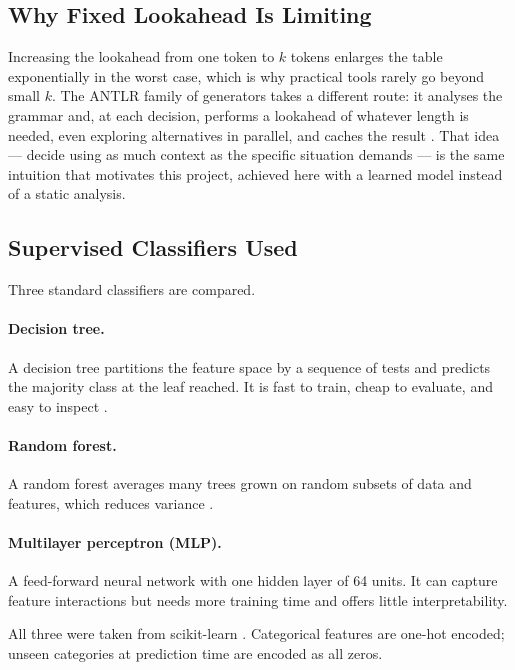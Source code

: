 \documentclass[12pt,a4paper]{article}
\begin{document}
\subsection{Why Fixed Lookahead Is Limiting}

Increasing the lookahead from one token to $k$ tokens enlarges the table
exponentially in the worst case, which is why practical tools rarely go beyond
small $k$. The ANTLR family of generators takes a different route: it analyses
the grammar and, at each decision, performs a lookahead of whatever length is
needed, even exploring alternatives in parallel, and caches the result
\cite{parr2011,parr2014}. That idea --- decide using as much context as the
specific situation demands --- is the same intuition that motivates this
project, achieved here with a learned model instead of a static analysis.

\subsection{Supervised Classifiers Used}

Three standard classifiers are compared.

\paragraph{Decision tree.} A decision tree partitions the feature space by a
sequence of tests and predicts the majority class at the leaf reached. It is
fast to train, cheap to evaluate, and easy to inspect \cite{quinlan1986,breiman1984}.

\paragraph{Random forest.} A random forest averages many trees grown on random
subsets of data and features, which reduces variance \cite{breiman2001}.

\paragraph{Multilayer perceptron (MLP).} A feed-forward neural network with
one hidden layer of 64 units. It can capture feature interactions but needs
more training time and offers little interpretability.

All three were taken from scikit-learn \cite{pedregosa2011}. Categorical
features are one-hot encoded; unseen categories at prediction time are encoded
as all zeros.
\end{document}
